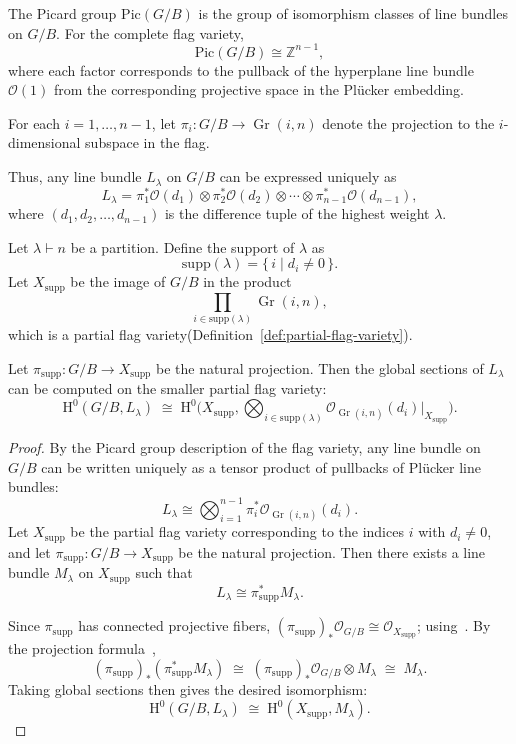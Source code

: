 \documentclass{amsart}
\DeclareMathOperator{\Gr}{Gr}
\begin{document}
\begin{proposition}
The Picard group \(\mathrm{Pic}(G/B)\) is the group of isomorphism classes of line bundles on \(G/B\). For the complete flag variety,
\[
\mathrm{Pic}(G/B) \cong \mathbb{Z}^{n-1},
\]
where each factor corresponds to the pullback of the hyperplane line bundle \(\mathcal{O}(1)\) from the corresponding projective space in the Pl\"ucker embedding.

For each $i = 1,\dots, n-1$, let $ \pi_i : G/B \longrightarrow \Gr(i,n)$
denote the projection to the $i$-dimensional subspace in the flag. 

Thus, any line bundle \(L_\lambda\) on \(G/B\) can be expressed uniquely as
\[
L_\lambda = \pi_1^* \mathcal{O}(d_1) \otimes \pi_2^* \mathcal{O}(d_2) \otimes \cdots \otimes \pi_{n-1}^* \mathcal{O}(d_{n-1}),
\]
where \((d_1, d_2, \dots, d_{n-1})\) is the difference tuple of the highest weight \(\lambda\). 
\end{proposition}

\begin{proposition}\label{prop:flag-grassmannian-sections}
Let $\lambda \vdash n$ be a partition. Define the support of $\lambda$ as
\[
\mathrm{supp}(\lambda) = \{\, i \mid d_i \neq 0 \,\}.
\]  
Let $X_{\mathrm{supp}}$ be the image of $G/B$ in the product 
\[
\prod_{i \in \mathrm{supp}(\lambda)} \Gr(i,n),
\]
which is a partial flag variety(Definition~\ref{def:partial-flag-variety}).

Let
$ \pi_{\mathrm{supp}} : G/B \longrightarrow X_{\mathrm{supp}}$
be the natural projection. Then the global sections of $L_\lambda$ can be computed on the smaller partial flag variety:
\[
\mathrm{H}^0(G/B, L_\lambda) \;\cong\; \mathrm{H}^0\Big(X_{\mathrm{supp}}, \bigotimes_{i \in \mathrm{supp}(\lambda)} \mathcal{O}_{\Gr(i,n)}(d_i) \Big|_{X_{\mathrm{supp}}} \Big).
\]
\end{proposition}

\begin{proof}
By the Picard group description of the flag variety, any line bundle on $G/B$ can be written uniquely as a tensor product of pullbacks of Plücker line bundles:
\[
L_\lambda \cong \bigotimes_{i=1}^{n-1} \pi_i^* \mathcal{O}_{\Gr(i,n)}(d_i).
\]
Let $X_{\mathrm{supp}}$ be the partial flag variety corresponding to the indices $i$ with $d_i \neq 0$, and let $\pi_{\mathrm{supp}}: G/B \to X_{\mathrm{supp}}$ be the natural projection. Then there exists a line bundle $M_\lambda$ on $X_{\mathrm{supp}}$ such that
\[
L_\lambda \cong \pi_{\mathrm{supp}}^* M_\lambda.
\]

Since $\pi_{\mathrm{supp}}$ has connected projective fibers, $(\pi_{\mathrm{supp}})_* \mathcal{O}_{G/B} \cong \mathcal{O}_{X_{\mathrm{supp}}}$;
using~\cite[Tag 0E0L]{stacks-project}. 
By the projection formula~\cite[Tag 01E8]{stacks-project},
\[
(\pi_{\mathrm{supp}})_* (\pi_{\mathrm{supp}}^* M_\lambda) \;\cong\; (\pi_{\mathrm{supp}})_* \mathcal{O}_{G/B} \otimes M_\lambda \;\cong\; M_\lambda.
\]
Taking global sections then gives the desired isomorphism:
\[
\mathrm{H}^0(G/B, L_\lambda) \;\cong\; \mathrm{H}^0(X_{\mathrm{supp}}, M_\lambda).
\]
\end{proof}
\end{document}
